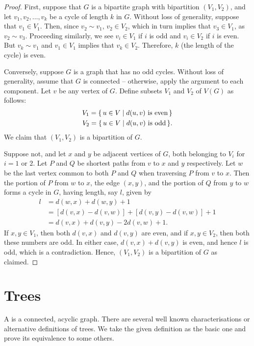 \begin{proof}
First, suppose that $G$ is a bipartite graph with bipartition $(V_1, V_2)$, and let $v_1, v_2, \ldots, v_k$ be a cycle of length $k$ in $G$. Without loss of generality, suppose that $v_1 \in V_1$. Then, since $v_2 \sim v_1$, $v_2 \in V_2$, which in turn implies that $v_3 \in V_1$, as $v_2 \sim v_3$. Proceeding similarly, we see $v_i \in V_1$ if $i$ is odd and $v_i \in V_2$ if $i$ is even. But $v_k \sim v_1$ and $v_1 \in V_1$ implies that $v_k \in V_2$. Therefore, $k$ (the length of the cycle) is even.

Conversely, suppose $G$ is a graph that has no odd cycles. Without loss of generality, assume that $G$ is connected -- otherwise, apply the argument to each component. Let $v$ be any vertex of $G$. Define subsets $V_1$ and $V_2$ of $V(G)$ as follows:
\begin{align*}
    V_1 = \qty{\, u \in V \mid d(u, v)\ \text{is even} \,} \\
    V_2 = \qty{\, u \in V \mid d(u, v)\ \text{is odd} \,}.
\end{align*}
We claim that $(V_1, V_2)$ is a bipartition of $G$.

Suppose not, and let $x$ and $y$ be adjacent vertices of $G$, both belonging to $V_i$ for $i = 1$ or $2$. Let $P$ and $Q$ be shortest paths from $v$ to $x$ and $y$ respectively. Let $w$ be the last vertex common to both $P$ and $Q$ when traversing $P$ from $v$ to $x$. Then the portion of $P$ from $w$ to $x$, the edge $(x, y)$, and the portion of $Q$ from $y$ to $w$ forms a cycle in $G$, having length, say $l$, given by
\begin{align*}
l & = d(w, x) + d(w, y) + 1 \\
& = [d(v, x) - d(v, w)] + [d(v, y) - d(v, w)] + 1 \\
& = d(v, x) + d(v, y) - 2 d(v, w) + 1.
\end{align*}
If $x, y \in V_1$, then both $d(v, x)$ and $d(v, y)$ are even, and if $x, y \in V_2$, then both these numbers are odd. In either case, $d(v, x) + d(v, y)$ is even, and hence $l$ is odd, which is a contradiction. Hence, $(V_1, V_2)$ is a bipartition of $G$ as claimed.
\end{proof}

\section{Trees}\label{sec:Trees}

A  is a connected, acyclic graph. There are several well known characterisations or alternative definitions of trees. We take the given definition as the basic one and prove its equivalence to some others.

